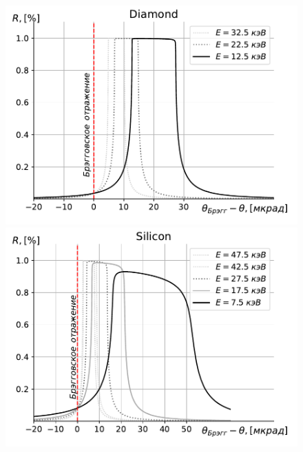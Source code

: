 \documentclass[14pt,a4paper]{extarticle}
\numberwithin{equation}{section}
\begin{document}
	\begin{figure}[h!]
		\centering  
		\begin{minipage}{0.49\textwidth}
			\centering
			\includegraphics[width=\textwidth]{pic/Diamond_bragg_R.pdf}
			\caption{}
			\label{fig:Diamond_bragg_R}
		\end{minipage}\hfill
		\begin{minipage}{0.49\textwidth}
			\centering
			\includegraphics[width=\textwidth]{pic/Silicon_bragg_R.pdf}
			\caption{}
			\label{fig:Silicon_bragg_R}
		\end{minipage}    
	\end{figure}
	
	\newpage
	
\end{document}
